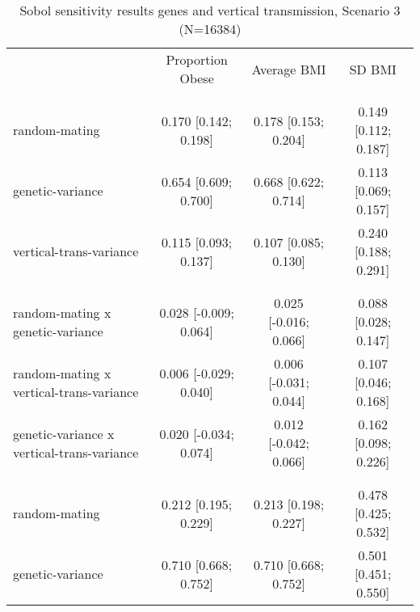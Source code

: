 
\begin{table}[htp]
\renewcommand{\arraystretch}{1.3}
\setlength{\tabcolsep}{5pt}
\caption{Sobol sensitivity results genes and vertical transmission, Scenario 3 (N=16384)}
\label{tab:sobol-snp-vt}
\footnotesize
\centering
\begin{threeparttable}
\begin{tabular}{lccc}
\hline
\addlinespace
& Proportion Obese & Average BMI & SD BMI \\
\addlinespace
\hline
\addlinespace
\multicolumn{4}{l}{\textbf{Scenario 3 (genes and vertical transmission)}} \\
\addlinespace[6pt]
\multicolumn{4}{l}{\hspace{1em} S1} \\
\hspace{1.5em} random-mating & 0.170 [0.142; 0.198]   & 0.178 [0.153; 0.204]   & 0.149 [0.112; 0.187] \\
	  \hspace{1.5em} genetic-variance & 0.654 [0.609; 0.700]   & 0.668 [0.622; 0.714]   & 0.113 [0.069; 0.157] \\
	  \hspace{1.5em} vertical-trans-variance & 0.115 [0.093; 0.137]   & 0.107 [0.085; 0.130]   & 0.240 [0.188; 0.291] \\
	 \\
\addlinespace[12pt]
\multicolumn{4}{l}{\hspace{1em} S2} \\ 
\hspace{1.5em} random-mating x genetic-variance & 0.028 [-0.009; 0.064]   & 0.025 [-0.016; 0.066]   & 0.088 [0.028; 0.147] \\
	  \hspace{1.5em} random-mating x vertical-trans-variance & 0.006 [-0.029; 0.040]   & 0.006 [-0.031; 0.044]   & 0.107 [0.046; 0.168] \\
	  \hspace{1.5em} genetic-variance x vertical-trans-variance & 0.020 [-0.034; 0.074]   & 0.012 [-0.042; 0.066]   & 0.162 [0.098; 0.226] \\
	 \\
\addlinespace[12pt]
\multicolumn{4}{l}{\hspace{1em} ST} \\ 
\hspace{1.5em} random-mating & 0.212 [0.195; 0.229]   & 0.213 [0.198; 0.227]   & 0.478 [0.425; 0.532] \\
	  \hspace{1.5em} genetic-variance & 0.710 [0.668; 0.752]   & 0.710 [0.668; 0.752]   & 0.501 [0.451; 0.550] \\

\end{tabular}
\end{threeparttable}
\end{table}
